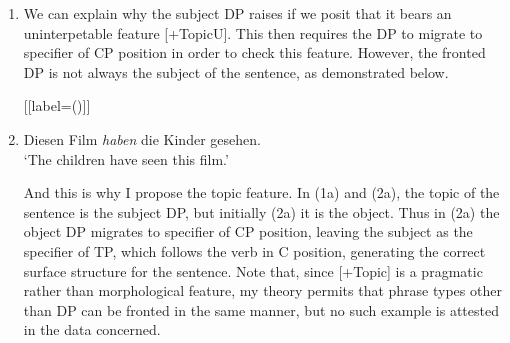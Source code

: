 \documentclass[12pt]{article}
\begin{document}
\begin{enumerate}[label=\textbf{\arabic*.}]
\begin{enumerate}[label=(\arabic*)]
	[{[label=(\arabic*)]}]
	\item
	\leavevmode\vadjust{\vspace{-\baselineskip}}\newline

	We can explain why the subject DP raises if we posit that it bears an uninterpetable feature [+TopicU]. This
	then requires the DP to migrate to specifier of CP position in order to check this feature. However, the fronted
	DP is not always the subject of the sentence, as demonstrated below.

	[{[label=(\arabic*)]}]
	\item Diesen Film \emph{haben} die Kinder gesehen.\\
	`The children have seen this film.'

	And this is why I propose the topic feature. In (1a) and (2a), the topic of the sentence is the subject DP, but initially
	(2a) it is the object. Thus in (2a) the object DP migrates to specifier of CP position, leaving the subject as the specifier
	of TP, which follows the verb in C position, generating the correct surface structure for the sentence. Note that, since
	[+Topic] is a pragmatic rather than morphological feature, my theory permits that phrase types other than DP can be fronted
	in the same manner, but no such example is attested in the data concerned.


\end{enumerate}
\end{enumerate}
\end{document}
